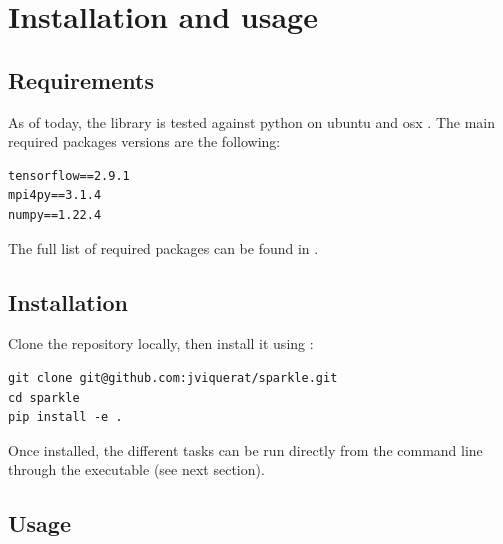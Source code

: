 \chapter{Installation and usage}

\section{Requirements}

As of today, the library is tested against python  on ubuntu  and osx . The main required packages versions are the following:

\begin{verbatim}
tensorflow==2.9.1
mpi4py==3.1.4
numpy==1.22.4
\end{verbatim}

The full list of required packages can be found in .

\section{Installation}

Clone the repository locally, then install it using :

\begin{verbatim}
git clone git@github.com:jviquerat/sparkle.git
cd sparkle
pip install -e .
\end{verbatim}

Once installed, the different tasks can be run directly from the command line through the  executable (see next section).

\section{Usage}

